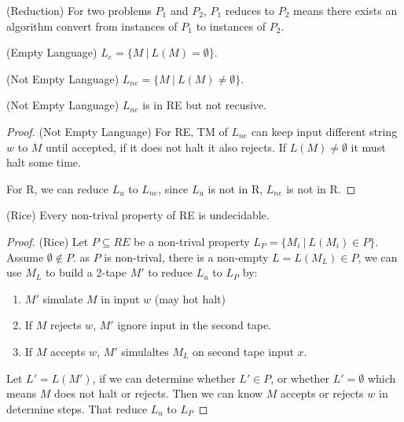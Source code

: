         \begin{definition}
            (Reduction) For two problems $P_1$ and $P_2$, $P_1$ reduces to $P_2$ means there exists an algorithm convert from instances of $P_1$ to instances of $P_2$.
        \end{definition}
        \begin{definition}
            (Empty Language) $L_{e}=\{M\ |\ L\left( M \right) =\emptyset\}$.
        \end{definition}
        \begin{definition}
            (Not Empty Language) $L_{ne}=\{M\ |\ L\left( M \right) \ne\emptyset\}$.
        \end{definition}
        \begin{theorem}
            (Not Empty Language) $L_{ne}$ is in RE but not recusive.
        \end{theorem}
        \begin{proof}
            (Not Empty Language) For RE, TM of $L_{ne}$ can keep input different string $w$ to $M$ until accepted, if it does not halt it also rejects. If $L\left( M \right) \ne \emptyset$ it must halt some time.

            For R, we can reduce $L_{u}$ to $L_{ne}$, since $L_{u}$ is not in R, $L_{ne}$ is not in R.
        \end{proof}
        \begin{theorem}
            (Rice) Every non-trival property of RE is undecidable.
        \end{theorem}
        \begin{proof}
            (Rice) Let $P\subseteq RE$ be a non-trival property $L_{P}=\{M_{i}\ |\ L\left( M_{i} \right) \in P\}$. Assume $\emptyset \notin P$. as $P$ is non-trival, there is a non-empty $L=L\left( M_{L} \right) \in P$, we can use $M_{L}$ to build a 2-tape $M'$ to reduce $L_{u}$ to $L_{P}$ by:
            \begin{enumerate}
                \item $M'$ simulate $M$ in input $w$ (may hot halt)
                \item If $M$ rejects $w$, $M'$ ignore input in the second tape.
                \item If $M$ accepts $w$, $M'$ simulaltes $M_{L}$ on second tape input $x$.
            \end{enumerate}
            Let $L'=L\left( M' \right) $, if we can determine whether $L'\in P$, or whether $L'=\emptyset$ which means $M$ does not halt or rejects. Then we can know $M$ accepts or rejects $w$ in determine steps. That reduce $L_{u}$ to $L_{P}$
        \end{proof}
